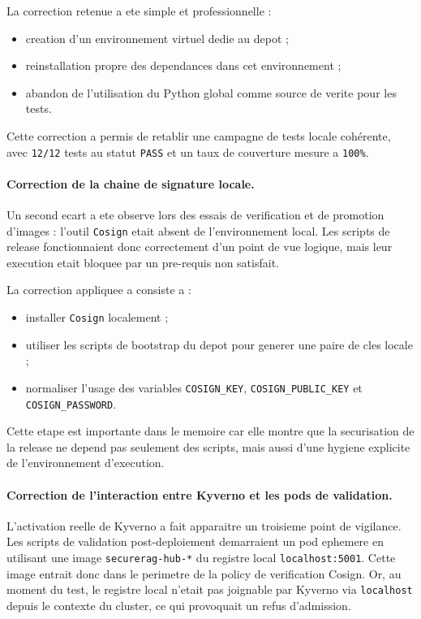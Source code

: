 La correction retenue a ete simple et professionnelle :

\begin{itemize}
  \item creation d'un environnement virtuel dedie au depot ;
  \item reinstallation propre des dependances dans cet environnement ;
  \item abandon de l'utilisation du Python global comme source de verite pour les tests.
\end{itemize}

Cette correction a permis de retablir une campagne de tests locale cohérente, avec \texttt{12/12} tests au statut \texttt{PASS} et un taux de couverture mesure a \texttt{100\%}.

\paragraph{Correction de la chaine de signature locale.}
Un second ecart a ete observe lors des essais de verification et de promotion d'images : l'outil \texttt{Cosign} etait absent de l'environnement local. Les scripts de release fonctionnaient donc correctement d'un point de vue logique, mais leur execution etait bloquee par un pre-requis non satisfait.

La correction appliquee a consiste a :

\begin{itemize}
  \item installer \texttt{Cosign} localement ;
  \item utiliser les scripts de bootstrap du depot pour generer une paire de cles locale ;
  \item normaliser l'usage des variables \texttt{COSIGN\_KEY}, \texttt{COSIGN\_PUBLIC\_KEY} et \texttt{COSIGN\_PASSWORD}.
\end{itemize}

Cette etape est importante dans le memoire car elle montre que la securisation de la release ne depend pas seulement des scripts, mais aussi d'une hygiene explicite de l'environnement d'execution.

\paragraph{Correction de l'interaction entre Kyverno et les pods de validation.}
L'activation reelle de Kyverno a fait apparaitre un troisieme point de vigilance. Les scripts de validation post-deploiement demarraient un pod ephemere en utilisant une image \texttt{securerag-hub-*} du registre local \texttt{localhost:5001}. Cette image entrait donc dans le perimetre de la policy de verification Cosign. Or, au moment du test, le registre local n'etait pas joignable par Kyverno via \texttt{localhost} depuis le contexte du cluster, ce qui provoquait un refus d'admission.

